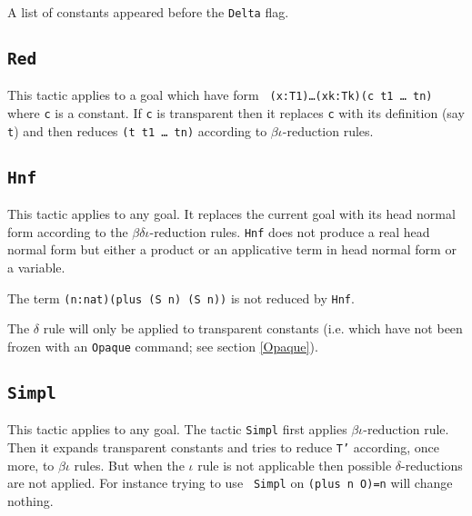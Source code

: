 \begin{ErrMsgs}
\item {}
  
  A list of constants appeared before the {\tt Delta} flag.
\end{ErrMsgs}


\subsection{{\tt Red}}

This tactic applies to a goal which have form {\tt
  (x:T1)\dots(xk:Tk)(c t1 \dots\ tn)} where {\tt c} is a constant.  If
{\tt c} is transparent then it replaces {\tt c} with its definition
(say {\tt t}) and then reduces {\tt (t t1 \dots\ tn)} according to
$\beta\iota$-reduction rules.

\begin{ErrMsgs}
\item {}
\end{ErrMsgs}

\subsection{{\tt Hnf}}

This tactic applies to any goal. It replaces the current goal with its
head normal form according to the $\beta\delta\iota$-reduction rules.
{\tt Hnf} does not produce a real head normal form but either a
product or an applicative term in head normal form or a variable.

\Example
The term \verb+(n:nat)(plus (S n) (S n))+ is not reduced by {\tt Hnf}.

\Rem The $\delta$ rule will only be applied to transparent constants
(i.e. which have not been frozen with an {\tt Opaque} command; see
section \ref{Opaque}).

\subsection{\tt Simpl}

This tactic applies to any goal. The tactic {\tt Simpl} first applies
$\beta\iota$-reduction rule.  Then it expands transparent constants
and tries to reduce {\tt T'} according, once more, to $\beta\iota$
rules. But when the $\iota$ rule is not applicable then possible
$\delta$-reductions are not applied.  For instance trying to use {\tt
  Simpl} on {\tt (plus n O)=n} will change nothing.

